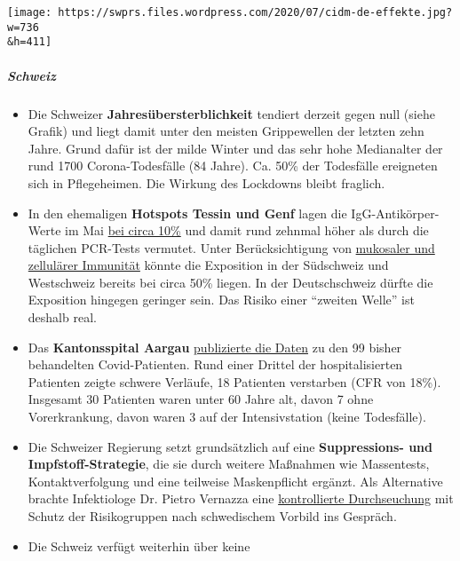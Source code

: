 \texttt{[image: https://swprs.files.wordpress.com/2020/07/cidm-de-effekte.jpg?w=736\\\&h=411]}

\hypertarget{schweiz}{%
\subparagraph{\texorpdfstring{\textbf{Schweiz}}{Schweiz}}\label{schweiz}}

\begin{itemize}
\tightlist
\item
  Die Schweizer \textbf{Jahresübersterblichkeit} tendiert derzeit gegen
  null (siehe Grafik) und liegt damit unter den meisten Grippewellen der
  letzten zehn Jahre. Grund dafür ist der milde Winter und das sehr hohe
  Medianalter der rund 1700 Corona-Todesfälle (84 Jahre). Ca. 50\% der
  Todesfälle ereigneten sich in Pflegeheimen. Die Wirkung des Lockdowns
  bleibt fraglich.
\item
  In den ehemaligen \textbf{Hotspots Tessin und Genf} lagen die
  IgG-Antikörper-Werte im Mai
  \href{https://infekt.ch/2020/07/sind-es-doch-10x-mehr-covid-19-faelle/}{bei
  circa 10\%} und damit rund zehnmal höher als durch die täglichen
  PCR-Tests vermutet. Unter Berücksichtigung von
  \href{https://swprs.org/coronavirus-antibody-tests-show-only-one-fifth-of-infections/}{mukosaler
  und zellulärer Immunität} könnte die Exposition in der Südschweiz und
  Westschweiz bereits bei circa 50\% liegen. In der Deutschschweiz
  dürfte die Exposition hingegen geringer sein. Das Risiko einer
  ``zweiten Welle'' ist deshalb real.
\item
  Das \textbf{Kantonsspital Aargau}
  \href{https://www.aargauerzeitung.ch/aargau/kanton-aargau/viele-schwere-coronafaelle-was-das-kantonsspital-aarau-ueber-covid-19-herausgefunden-hat-138523777}{publizierte
  die Daten} zu den 99 bisher behandelten Covid-Patienten. Rund einer
  Drittel der hospitalisierten Patienten zeigte schwere Verläufe, 18
  Patienten verstarben (CFR von 18\%). Insgesamt 30 Patienten waren
  unter 60 Jahre alt, davon 7 ohne Vorerkrankung, davon waren 3 auf der
  Intensivstation (keine Todesfälle).
\item
  Die Schweizer Regierung setzt grundsätzlich auf eine
  \textbf{Suppressions- und Impfstoff-Strategie}, die sie durch weitere
  Maßnahmen wie Massentests, Kontaktverfolgung und eine teilweise
  Maskenpflicht ergänzt. Als Alternative brachte Infektiologe Dr. Pietro
  Vernazza eine
  \href{https://corona-transition.org/der-infektiologe-prof-pietro-vernazza-sieht-covid-19-im-bereich-einer}{kontrollierte
  Durchseuchung} mit Schutz der Risikogruppen nach schwedischem Vorbild
  ins Gespräch.
\item
  Die Schweiz verfügt weiterhin über keine

\end{itemize}
